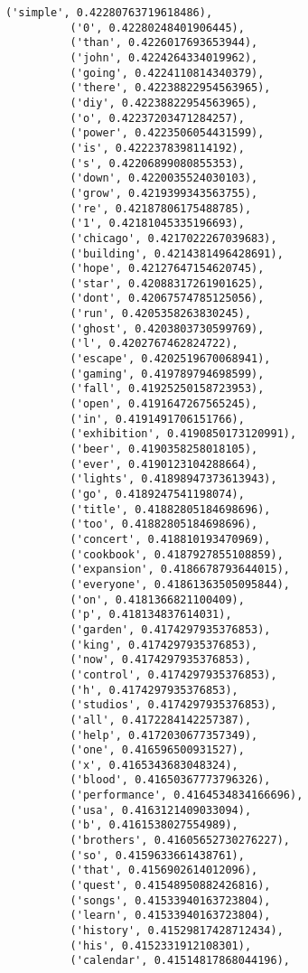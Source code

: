 \documentclass[11pt]{article}
\begin{document}
\begin{Verbatim}[commandchars=\\\{\}]
          ('simple', 0.42280763719618486),
          ('0', 0.42280248401906445),
          ('than', 0.4226017693653944),
          ('john', 0.4224264334019962),
          ('going', 0.4224110814340379),
          ('there', 0.42238822954563965),
          ('diy', 0.42238822954563965),
          ('o', 0.42237203471284257),
          ('power', 0.4223506054431599),
          ('is', 0.4222378398114192),
          ('s', 0.42206899080855353),
          ('down', 0.4220035524030103),
          ('grow', 0.4219399343563755),
          ('re', 0.42187806175488785),
          ('1', 0.42181045335196693),
          ('chicago', 0.4217022267039683),
          ('building', 0.4214381496428691),
          ('hope', 0.42127647154620745),
          ('star', 0.42088317261901625),
          ('dont', 0.42067574785125056),
          ('run', 0.4205358263830245),
          ('ghost', 0.4203803730599769),
          ('l', 0.4202767462824722),
          ('escape', 0.4202519670068941),
          ('gaming', 0.419789794698599),
          ('fall', 0.41925250158723953),
          ('open', 0.4191647267565245),
          ('in', 0.4191491706151766),
          ('exhibition', 0.4190850173120991),
          ('beer', 0.4190358258018105),
          ('ever', 0.4190123104288664),
          ('lights', 0.41898947373613943),
          ('go', 0.4189247541198074),
          ('title', 0.41882805184698696),
          ('too', 0.41882805184698696),
          ('concert', 0.418810193470969),
          ('cookbook', 0.4187927855108859),
          ('expansion', 0.4186678793644015),
          ('everyone', 0.41861363505095844),
          ('on', 0.4181366821100409),
          ('p', 0.418134837614031),
          ('garden', 0.4174297935376853),
          ('king', 0.4174297935376853),
          ('now', 0.4174297935376853),
          ('control', 0.4174297935376853),
          ('h', 0.4174297935376853),
          ('studios', 0.4174297935376853),
          ('all', 0.4172284142257387),
          ('help', 0.4172030677357349),
          ('one', 0.416596500931527),
          ('x', 0.4165343683048324),
          ('blood', 0.41650367773796326),
          ('performance', 0.4164534834166696),
          ('usa', 0.4163121409033094),
          ('b', 0.4161538027554989),
          ('brothers', 0.41605652730276227),
          ('so', 0.4159633661438761),
          ('that', 0.4156902614012096),
          ('quest', 0.41548950882426816),
          ('songs', 0.41533940163723804),
          ('learn', 0.41533940163723804),
          ('history', 0.41529817428712434),
          ('his', 0.4152331912108301),
          ('calendar', 0.41514817868044196),

\end{Verbatim}
\end{document}
